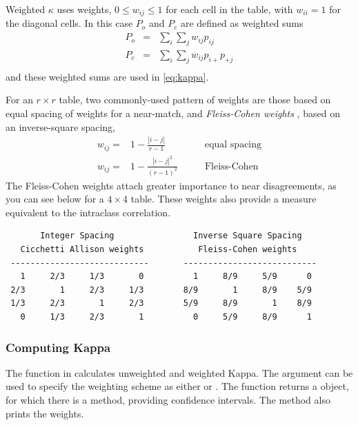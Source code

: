 \documentclass[11pt]{book}\usepackage[]{graphicx}\usepackage[]{color}
\begin{document}
Weighted \(\kappa\) uses weights, $0 \le w_{ij} \le 1$ for each cell in the
table, with $w_{ii} =1$ for the diagonal cells.
In this case $P_o$ and $P_c$ are defined as weighted sums
\begin{eqnarray*}
P_o  & = & \sum_i \sum_j w_{ij} p_{ij} \\
P_c  & = & \sum_i \sum_j w_{ij} p_{i+} p_{+j}\\
\end{eqnarray*}
and these weighted sums are used in \eqref{eq:kappa}.

For an $r \times r$ table, two commonly-used pattern of weights are those based on
equal spacing of weights
\citep{CicchettiAllison:71}
for a near-match,
and
\emph{Fleiss-Cohen weights}
\citep{FleissCohen:73}, based on an inverse-square
spacing,
\begin{eqnarray*}
w_{ij} = & 1 - \frac{|i-j|}{r-1} & \quad\quad\mbox{equal spacing} \\
w_{ij} = & 1 - \frac{|i-j|^2}{(r-1)^2} & \quad\quad\mbox{Fleiss-Cohen}
\end{eqnarray*}
The Fleiss-Cohen weights attach greater importance
to near disagreements, as you can see below for a $4 \times 4$ table.
These weights also provide a measure equivalent to the intraclass
correlation.

\begin{verbatim}
       Integer Spacing                Inverse Square Spacing
   Cicchetti Allison weights           Fleiss-Cohen weights
 ----------------------------       ---------------------------
   1     2/3     1/3       0          1     8/9     5/9      0
 2/3       1     2/3     1/3        8/9       1     8/9    5/9
 1/3     2/3       1     2/3        5/9     8/9       1    8/9
   0     1/3     2/3       1          0     5/9     8/9      1
\end{verbatim}

\subsubsection{Computing Kappa}

The function  in  calculates unweighted and weighted
Kappa.  The  argument can be used to specify the weighting
scheme as either  or .
The function returns a  object, for which there
is a  method, providing confidence intervals.
The  method also prints the weights.
\end{document}
